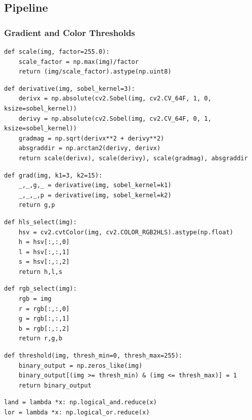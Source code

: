 \documentclass[11pt]{article}
\begin{document}
\subsection*{Pipeline}
\label{sec-2-3}

\subsubsection*{Gradient and Color Thresholds}
\label{sec-2-3-1}

\begin{verbatim}
def scale(img, factor=255.0):
    scale_factor = np.max(img)/factor
    return (img/scale_factor).astype(np.uint8)
\end{verbatim}

\begin{verbatim}
def derivative(img, sobel_kernel=3):
    derivx = np.absolute(cv2.Sobel(img, cv2.CV_64F, 1, 0, ksize=sobel_kernel))
    derivy = np.absolute(cv2.Sobel(img, cv2.CV_64F, 0, 1, ksize=sobel_kernel))
    gradmag = np.sqrt(derivx**2 + derivy**2)
    absgraddir = np.arctan2(derivy, derivx)
    return scale(derivx), scale(derivy), scale(gradmag), absgraddir
\end{verbatim}

\begin{verbatim}
def grad(img, k1=3, k2=15):
    _,_,g,_ = derivative(img, sobel_kernel=k1)
    _,_,_,p = derivative(img, sobel_kernel=k2)
    return g,p
\end{verbatim}

\begin{verbatim}
def hls_select(img):
    hsv = cv2.cvtColor(img, cv2.COLOR_RGB2HLS).astype(np.float)
    h = hsv[:,:,0]
    l = hsv[:,:,1]
    s = hsv[:,:,2]
    return h,l,s
\end{verbatim}

\begin{verbatim}
def rgb_select(img):
    rgb = img
    r = rgb[:,:,0]
    g = rgb[:,:,1]
    b = rgb[:,:,2]
    return r,g,b
\end{verbatim}

\begin{verbatim}
def threshold(img, thresh_min=0, thresh_max=255):
    binary_output = np.zeros_like(img)
    binary_output[(img >= thresh_min) & (img <= thresh_max)] = 1
    return binary_output
\end{verbatim}

\begin{verbatim}
land = lambda *x: np.logical_and.reduce(x)
lor = lambda *x: np.logical_or.reduce(x)
\end{verbatim}
\end{document}
